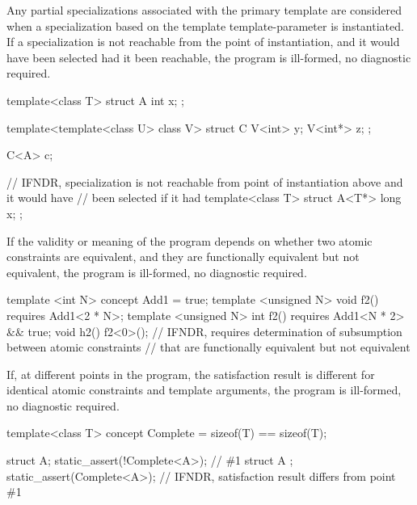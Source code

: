 
\pnum
Any partial specializations
associated with the primary template are considered when a specialization
based on the template template-parameter is instantiated.
If a specialization is not reachable
from the point of instantiation,
and it would have been selected had it been reachable,
the program is ill-formed, no diagnostic required.

\pnum
\begin{example}
\begin{codeblock}
template<class T> struct A {
  int x;
};

template<template<class U> class V> struct C {
  V<int> y;
  V<int*> z;
};

C<A> c;

// IFNDR, specialization is not reachable from point of instantiation above and it would have
// been selected if it had
template<class T> struct A<T*> {
  long x;
};
\end{codeblock}
\end{example}


\pnum
If the validity or meaning of the program
depends on whether two atomic constraints are equivalent,
and they are functionally equivalent but not equivalent,
the program is ill-formed, no diagnostic required.

\pnum
\begin{example}
\begin{codeblock}
template <int N> concept Add1 = true;
template <unsigned N> void f2()
requires Add1<2 * N>;
template <unsigned N> int f2()
requires Add1<N * 2> && true;
void h2() {
f2<0>();        // IFNDR, requires determination of subsumption between atomic constraints
                // that are functionally equivalent but not equivalent
}
\end{codeblock}
\end{example}


\pnum
If, at different points in the program,
the satisfaction result is different
for identical atomic constraints and template arguments,
the program is ill-formed, no diagnostic required.

\pnum
\begin{example}
\begin{codeblock}
template<class T>
concept Complete = sizeof(T) == sizeof(T);

struct A;
static_assert(!Complete<A>);    // \#1
struct A {};
static_assert(Complete<A>);     // IFNDR, satisfaction result differs from point \#1
\end{codeblock}
\end{example}

